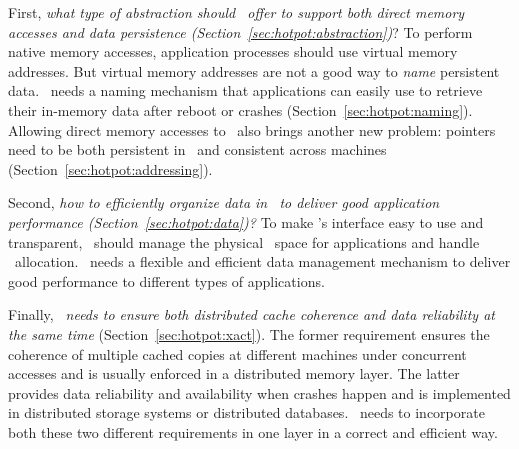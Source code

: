 First, {\em what type of abstraction should \dsnvm\ offer to support both direct memory accesses and data persistence (Section~\ref{sec:hotpot:abstraction})}?
To perform native memory accesses, application processes should use virtual memory addresses. 
But virtual memory addresses are not a good way to {\em name} persistent data.
\dsnvm\ needs a naming mechanism that applications can easily use to retrieve their in-memory data after reboot or crashes (Section~\ref{sec:hotpot:naming}).
Allowing direct memory accesses to \dsnvm\ also brings another new problem:
pointers need to be both persistent in \nvm\ and consistent across machines (Section~\ref{sec:hotpot:addressing}).

Second, {\em how to efficiently organize data in \dsnvm\ to deliver good application performance (Section~\ref{sec:hotpot:data})?}
To make \dsnvm's interface easy to use and transparent, 
\dsnvm\ should manage the physical \nvm\ space for applications and handle \nvm\ allocation.
\dsnvm\ needs a flexible and efficient data management mechanism to deliver good performance to different types of applications.

Finally, {\em \dsnvm\ needs to ensure both distributed cache coherence and data reliability at the same time} (Section~\ref{sec:hotpot:xact}).
The former requirement ensures the coherence of multiple cached copies at different machines under concurrent accesses and is usually enforced in a distributed memory layer.
The latter provides data reliability and availability when crashes happen and is implemented in distributed storage systems or distributed databases.
\dsnvm\ needs to incorporate both these two different requirements in one layer in a correct and efficient way.
